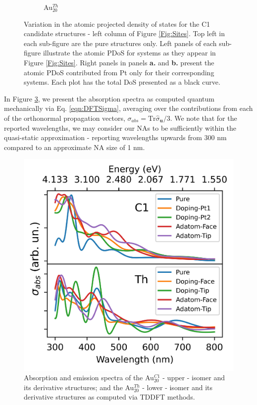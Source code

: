 \begin{figure}
\begin{subfigure}[b]{0.45\textwidth}
    \caption{Au$_{20}^{Th}$}
    \label{Fig:ThDos}
    \end{subfigure}
    \caption{Variation in the atomic projected density of states for the C1 candidate structures - left column of Figure \ref{Fig:Sites}. Top left in each sub-figure are the pure structures only. Left panels of each sub-figure illustrate the atomic PDoS for systems as they appear in Figure \ref{Fig:Sites}. Right panels in panels \textbf{a.} and \textbf{b.} present the atomic PDoS contributed from Pt only for their corresponding systems. Each plot has the total DoS presented as a black curve.}
    \label{Fig:AuPt_PDoS}
\end{figure}

In Figure \ref{Fig:DFT_Spec}, we present the absorption spectra as computed quantum mechanically via Eq. \ref{eqn:DFTSigma}, averaging over the contributions from each of the orthonormal propagation vectors, $\sigma_{abs}=\mathrm{Tr}\hat\sigma{_\mathbf{u}}/3$. We note that for the reported wavelengths, we may consider our NAs to be sufficiently within the quasi-static approximation - reporting wavelengths upwards from 300 nm compared to an approximate NA size of 1 nm.

\begin{figure}[ht!]
    \centering
    \includegraphics{figures/LM/AuPt_EPJ/Spectra_Abs.jpeg}
    \caption{Absorption and emission spectra of the Au$_{20}^{C1}$ - upper - isomer and its derivative structures; and the Au$_{20}^{Th}$ - lower - isomer and its derivative structures as computed via TDDFT methods.}
    \label{Fig:DFT_Spec}
\end{figure}


